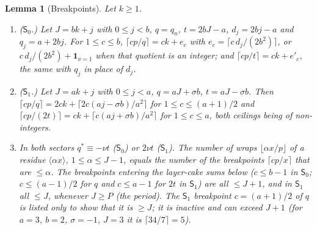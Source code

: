 \documentclass[11pt]{article}
\newtheorem{lemma}[theorem]{Lemma}
\theoremstyle{definition}
\newcommand{\ind}{\mathbf 1}
\begin{document}
\begin{lemma}[Breakpoints]
\label{lem:K}
Let $k\geq1$.
\begin{enumerate}[label=(\alph*)]
\item \textup{($\mathsf S_0$.)}  Let $J=bk+j$ with $0\leq j<b$,
$q=q_n$, $t=2bJ-a$, $d_j=2bj-a$ and $q_j=a+2bj$.  For $1\leq c\leq b$,
$\lceil cp/q\rceil=ck+e_c$ with $e_c=\lceil c\,d_j/(2b^2)\rceil$, or
$c\,d_j/(2b^2)+\ind_{\nu=1}$ when that quotient is an integer; and
$\lceil cp/t\rceil=ck+e'_c$, the same with $q_j$ in place of $d_j$.
\item \textup{($\mathsf S_1$.)}  Let $J=ak+j$ with $0\leq j<a$,
$q=aJ+\sigma b$, $t=aJ-\sigma b$.  Then
$\lceil cp/q\rceil=2ck+\lceil2c(aj-\sigma b)/a^2\rceil$ for
$1\leq c\leq(a+1)/2$ and
$\lceil cp/(2t)\rceil=ck+\lceil c(aj+\sigma b)/a^2\rceil$ for
$1\leq c\leq a$, both ceilings being of non-integers.
\item In both sectors $q^*\equiv-\nu t$ ($\mathsf S_0$) or $2\nu t$
($\mathsf S_1$).  The number of wraps $\lfloor\alpha x/p\rfloor$ of a
residue $\langle\alpha x\rangle$, $1\leq\alpha\leq J-1$, equals the number
of the breakpoints $\lceil cp/x\rceil$ that are $\leq\alpha$.  The
breakpoints entering the layer-cake sums below ($c\leq b-1$ in
$\mathsf S_0$; $c\leq(a-1)/2$ for $q$ and $c\leq a-1$ for $2t$ in
$\mathsf S_1$) are all $\leq J+1$, and in $\mathsf S_1$ all $\leq J$,
whenever $J\geq P$ (the period).  The $\mathsf S_1$ breakpoint
$c=(a+1)/2$ of $q$ is listed only to show that it is $\geq J$; it is
inactive and can exceed $J+1$ (for $a=3$, $b=2$, $\sigma=-1$, $J=3$ it is
$\lceil34/7\rceil=5$).
\end{enumerate}
\end{lemma}
\end{document}
